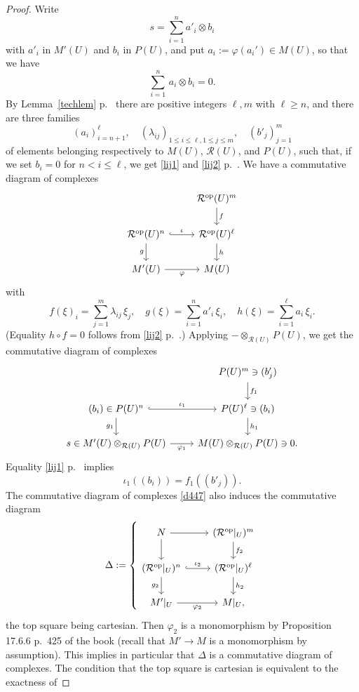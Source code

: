 \documentclass[12pt]{article}
\theoremstyle{remark}
\theoremstyle{definition}
\newcommand{\cc}{\mathcal}
\newcommand{\pp}{\varphi}
\DeclareMathOperator{\op}{op}
\begin{document}
\begin{proof}
Write 
$$
s=\sum_{i=1}^na'_i\otimes b_i
$$ 
with $a'_i$ in $M'(U)$ and $b_i$ in $P(U)$, and put $a_i:=\pp(a_i')\in M(U)$, so that we have 
$$
\sum_{i=1}^n\,a_i\otimes b_i=0.
$$ 
By Lemma~\ref{techlem} p.~\pageref{techlem} there are positive integers $\ell,m$ with $\ell\ge n$, and there are three families 
$$
(a_i)_{i=n+1}^\ell,\quad(\lambda_{ij})_{1\le i\le\ell,1\le j\le m},\quad(b'_j)_{j=1}^m
$$ 
of elements belonging respectively to $M(U)$, $\cc R(U)$, and $P(U)$, such that, if we set $b_i=0$ for $n<i\le\ell$, we get \eqref{lij1} and \eqref{lij2} p.~\pageref{lij1}. We have a commutative diagram of complexes
%
\begin{equation}\label{d447}
\begin{tikzcd}
{}&\cc R^{\op}(U)^m\ar{d}{f}\\ 
\cc R^{\op}(U)^n\ar[hook]{r}{\iota}\ar{d}[swap]{g}&\cc R^{\op}(U)^\ell\ar{d}{h}\\ 
M'(U)\ar{r}[swap]{\pp}&M(U)
\end{tikzcd}
\end{equation}
%
with 
$$
f(\xi)_i=\sum_{j=1}^m\lambda_{ij}\,\xi_j,\quad g(\xi)=\sum_{i=1}^na'_i\,\xi_i,\quad h(\xi)=\sum_{i=1}^\ell a_i\,\xi_i.
$$ 
(Equality $h\circ f=0$ follows from \eqref{lij2} p.~\pageref{lij2}.) Applying $-\otimes_{\cc R(U)}P(U)$, we get the commutative diagram of complexes 
%
\begin{equation}\label{pumb}
\begin{tikzcd}
{}&P(U)^m\ni(b'_j)\ar{d}{f_1}\\ 
(b_i)\in P(U)^n\ar[hook]{r}{\iota_1}\ar{d}[swap]{g_1}&P(U)^\ell\ni(b_i)\ar{d}{h_1}\\ 
s\in M'(U)\otimes_{\cc R(U)}P(U)\ar{r}[swap]{\pp_1}&M(U)\otimes_{\cc R(U)}P(U)\ni0.
\end{tikzcd}
\end{equation}
% 
Equality \eqref{lij1} p.~\pageref{lij1} implies  
%
\begin{equation}\label{g1h1}
\iota_1((b_i))=f_1((b'_j)).
\end{equation}
%
The commutative diagram of complexes \eqref{d447} also induces the commutative diagram 
$$
\Delta:=\left\{
\begin{tikzcd}
N\ar{r}\ar{d}&(\cc R^{\op}|_U)^m\ar{d}{f_2}\\ 
(\cc R^{\op}|_U)^n\ar[hook]{r}{\iota_2}\ar{d}[swap]{g_2}&(\cc R^{\op}|_U)^\ell\ar{d}{h_2}\\ 
M'|_U\ar{r}[swap]{\pp_2}&M|_U,
\end{tikzcd}
\right.
$$
the top square being cartesian. Then $\pp_2$ is a monomorphism by Proposition 17.6.6 p.~425 of the book (recall that $M'\to M$ is a monomorphism by assumption). This implies in particular that $\Delta$ is a commutative diagram of complexes. The condition that the top square is cartesian is equivalent to the exactness of 

\end{proof}
\end{document}
